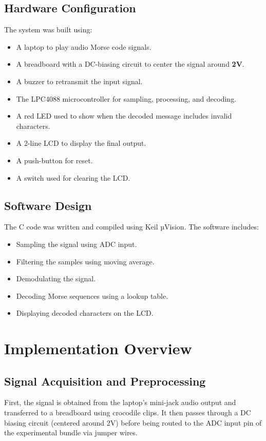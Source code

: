 \documentclass{article}
\begin{document}
\subsection{Hardware Configuration}
The system was built using:
\begin{itemize}
    \item A laptop to play audio Morse code signals.
    \item A breadboard with a DC-biasing circuit to center the signal around \textbf{2V}.
    \item A buzzer to retransmit the input signal.
    \item The LPC4088 microcontroller for sampling, processing, and decoding.
    \item A red LED used to show when the decoded message includes invalid characters.
    \item A 2-line LCD to display the final output.
    \item A push-button for reset.
    \item A switch used for clearing the LCD. 
\end{itemize}

\subsection{Software Design}
The C code was written and compiled using Keil µVision. The software includes:
\begin{itemize}
    \item Sampling the signal using ADC input.
    \item Filtering the samples using moving average.
    \item Demodulating the signal.
    \item Decoding Morse sequences using a lookup table.
    \item Displaying decoded characters on the LCD.
\end{itemize}


\section{Implementation Overview}

\subsection{Signal Acquisition and Preprocessing}
First, the signal is obtained from the laptop's mini-jack audio output and transferred to a breadboard 
using crocodile clips. It then passes through a DC biasing circuit (centered around 2V) 
before being routed to the ADC input pin of the experimental bundle via jumper wires.
\end{document}
